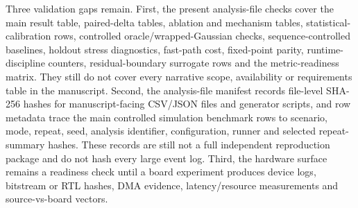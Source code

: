 \documentclass[11pt]{article}
\newcommand{\softwarehil}{controlled simulation}
\begin{document}
Three validation gaps remain.  First, the present analysis-file checks cover the
main result table, paired-delta tables, ablation and mechanism tables,
statistical-calibration rows, controlled oracle/wrapped-Gaussian checks,
sequence-controlled baselines, holdout stress diagnostics, fast-path cost,
fixed-point parity, runtime-discipline counters, residual-boundary surrogate
rows and the metric-readiness matrix.  They still do not cover every narrative
scope, availability or requirements table in the manuscript.  Second, the
analysis-file manifest records file-level SHA-256 hashes for manuscript-facing
CSV/JSON files and generator scripts, and row metadata trace the
main \softwarehil{} benchmark rows to scenario,
mode, repeat, seed, analysis identifier, configuration, runner and selected repeat-summary
hashes.  These records are still not a full independent reproduction package
and do not hash every large event log.  Third, the
hardware surface remains a readiness check until a board experiment
produces device logs, bitstream or RTL hashes, DMA evidence, latency/resource
measurements and source-vs-board vectors.
\end{document}
